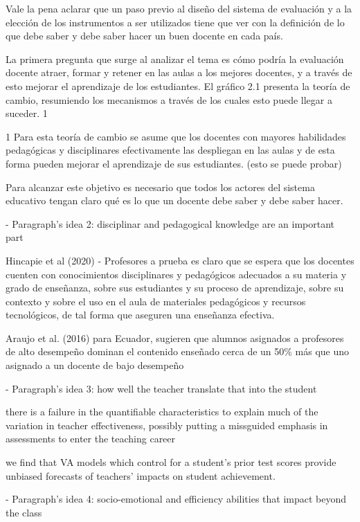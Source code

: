 Vale la pena aclarar que un paso previo al diseño del sistema de evaluación y a la elección de los instrumentos a ser utilizados tiene que ver con la definición de lo que debe saber y debe saber hacer un buen docente en cada país.

La primera pregunta que surge al analizar el tema es cómo podría la evaluación docente atraer, formar y retener en las aulas a los mejores docentes, y a través de esto mejorar el aprendizaje de los estudiantes. El gráfico 2.1 presenta la teoría de cambio, resumiendo los
mecanismos a través de los cuales esto puede llegar a suceder. 1

1 Para esta teoría de cambio se asume que los docentes con mayores habilidades pedagógicas y disciplinares efectivamente las despliegan en las aulas y de esta forma pueden mejorar el aprendizaje de sus estudiantes.
(esto se puede probar)


Para alcanzar este objetivo es necesario que todos los actores del sistema educativo tengan claro qué es lo que un docente debe saber y debe saber hacer.


- Paragraph's idea 2: disciplinar and pedagogical knowledge are an important part

Hincapie et al (2020) - Profesores a prueba
es claro que se espera que los docentes cuenten con conocimientos disciplinares y pedagógicos adecuados a su materia y grado de enseñanza, sobre sus estudiantes y su proceso de aprendizaje, sobre su contexto y sobre el uso en el aula de materiales pedagógicos y recursos tecnológicos, de tal forma que aseguren una enseñanza efectiva.

Araujo et al. (2016) para Ecuador, sugieren que alumnos asignados a profesores de alto desempeño dominan el contenido enseñado cerca de un 50\% más que uno asignado a un docente de bajo desempeño



- Paragraph's idea 3: how well the teacher translate that into the student

there is a failure in the quantifiable characteristics to explain much of the variation in teacher effectiveness, possibly putting a missguided emphasis in assessments to enter the teaching career \citep{Hanushek_et_al_2012}

we find that VA models which control for a student’s prior test scores provide unbiased forecasts of teachers’ impacts on student achievement. \citep{Chetty_et_al_2014b}


- Paragraph's idea 4: socio-emotional and efficiency abilities that impact beyond the class



